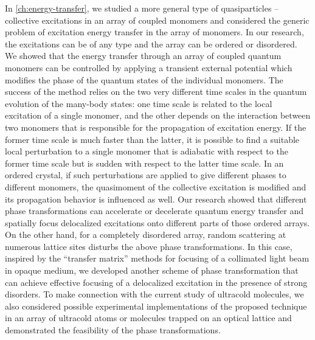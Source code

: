 In \autoref{ch:energy-transfer}, we studied a more general type of quasiparticles -- collective excitations in an array of 
coupled monomers and considered the generic problem of excitation energy transfer in the array of monomers. In our research, the excitations can be of any type and the array can be ordered or disordered.  We 
showed that the energy transfer through an array of coupled quantum monomers can be controlled by applying a 
transient external potential which modifies the phase of the quantum states of the individual monomers. The success of the method relies 
on the two very different time scales in the quantum evolution of the many-body states: one time scale is related to the 
local excitation of a single monomer, and the other depends on the interaction between two monomers that is responsible
for the propagation of excitation energy. If the former time scale is much faster than the latter, it is possible to find a suitable
local perturbation to a single monomer that is adiabatic with respect to the former time scale but is sudden
with respect to the latter time scale.  In an ordered crystal, if such perturbations are applied to give different phases to 
different monomers, the quasimoment of the collective excitation is modified and its propagation behavior is influenced
as well. Our research showed that different phase transformations can accelerate or decelerate quantum energy transfer and 
spatially focus delocalized excitations onto different parts of those ordered arrays. On the other hand, for a completely disordered array,  random scattering at numerous lattice sites disturbs the above phase transformations. In this case,  inspired by the ``transfer matrix'' methods for focusing of a 
collimated light beam in opaque medium\cite{opaque-1, Gigan-TMeasure-PRL10, Mosk-NPhot10, Cizmar-NPhot10, 
Silberberg-11, Chatel-Focusing-11, Lagendijk-Focusing-11, zhenia-11, cui-11, kim-11},
we developed another scheme of phase transformation that 
can achieve effective focusing of a delocalized excitation in the presence of strong disorders. To make connection with the current study of  
ultracold molecules,  we also considered possible experimental implementations of the proposed technique in an array of 
ultracold atoms or molecules trapped on an optical lattice and demonstrated the feasibility of the phase transformations. 
  


